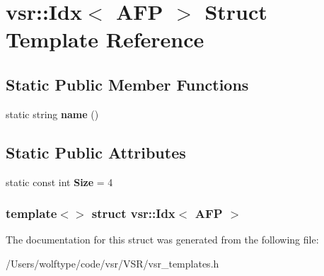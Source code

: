 \hypertarget{structvsr_1_1_idx_3_01_a_f_p_01_4}{\section{vsr\-:\-:Idx$<$ A\-F\-P $>$ Struct Template Reference}
\label{structvsr_1_1_idx_3_01_a_f_p_01_4}
}
\subsection*{Static Public Member Functions}
\begin{DoxyCompactItemize}
\item 
\hypertarget{structvsr_1_1_idx_3_01_a_f_p_01_4_a4da22f294f31df0b137b2cb2ffadd716}{static string {\bfseries name} ()}\label{structvsr_1_1_idx_3_01_a_f_p_01_4_a4da22f294f31df0b137b2cb2ffadd716}

\end{DoxyCompactItemize}
\subsection*{Static Public Attributes}
\begin{DoxyCompactItemize}
\item 
\hypertarget{structvsr_1_1_idx_3_01_a_f_p_01_4_af498610c646225590f48c7d759a40602}{static const int {\bfseries Size} = 4}\label{structvsr_1_1_idx_3_01_a_f_p_01_4_af498610c646225590f48c7d759a40602}

\end{DoxyCompactItemize}
\subsubsection*{template$<$$>$ struct vsr\-::\-Idx$<$ A\-F\-P $>$}



The documentation for this struct was generated from the following file\-:\begin{DoxyCompactItemize}
\item 
/\-Users/wolftype/code/vsr/\-V\-S\-R/vsr\-\_\-templates.\-h\end{DoxyCompactItemize}
